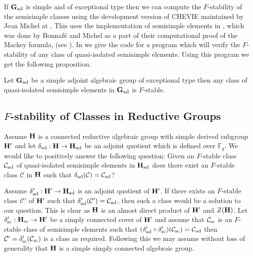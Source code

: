 \documentclass[eqthmnum]{jt-calcs}
\begin{document}
If $\mathbf{G}_{\operatorname{ad}}$ is simple and of exceptional type then we can compute the $F$-stability of the semisimple classes using the development version of CHEVIE maintained by Jean Michel at \cite{michel:2011:CHEVIE-development}. This uses the implementation of semisimple elements in \cite{geck-hiss:1996:CHEVIE}, which was done by Bonnaf\'{e} and Michel as a part of their computational proof of the Mackey formula, (see \cite{bonnafe-michel:2011:mackey-formula}). In \cite[Appendix D]{taylor:2012:thesis} we give the code for a program which will verify the $F$-stability of any class of quasi-isolated semisimple elements. Using this program we get the following proposition.

\begin{prop}
Let $\mathbf{G}_{\operatorname{ad}}$ be a simple adjoint algebraic group of exceptional type then any class of quasi-isolated semisimple elements in $\mathbf{G}_{\operatorname{ad}}$ is $F$-stable.
\end{prop}

\subsection{\texorpdfstring{$F$-stability of Classes in Reductive Groups}{Stability of Classes in Reductive Groups}}
\begin{pa}
Assume $\mathbf{H}$ is a connected reductive algebraic group with simple derived subgroup $\mathbf{H}'$ and let $\delta_{\operatorname{ad}} : \mathbf{H} \to \mathbf{H}_{\operatorname{ad}}$ be an adjoint quotient which is defined over $\mathbb{F}_q$. We would like to positively answer the following question: Given an $F$-stable class $\mathcal{C}_{\operatorname{ad}}$ of quasi-isolated semisimple elements in $\mathbf{H}_{\operatorname{ad}}$ does there exist an $F$-stable class $\mathcal{C}$ in $\mathbf{H}$ such that $\delta_{\operatorname{ad}}(\mathcal{C}) = \mathcal{C}_{\operatorname{ad}}$?

Assume $\delta_{\operatorname{ad}}' : \mathbf{H}' \to \mathbf{H}_{\operatorname{ad}}$ is an adjoint quotient of $\mathbf{H}'$. If there exists an $F$-stable class $\mathcal{C}'$ of $\mathbf{H}'$ such that $\delta_{\operatorname{ad}}'(\mathcal{C}') = \mathcal{C}_{\operatorname{ad}}$, then such a class would be a solution to our question. This is clear as $\mathbf{H}$ is an almost direct product of $\mathbf{H}'$ and $Z(\mathbf{H})$. Let $\delta_{\operatorname{sc}}' : \mathbf{H}_{\operatorname{sc}} \to \mathbf{H}'$ be a simply connected cover of $\mathbf{H}'$ and assume that $\mathcal{C}_{\operatorname{sc}}$ is an $F$-stable class of semisimple elements such that $(\delta_{\operatorname{ad}}'\circ\delta_{\operatorname{sc}}')(\mathcal{C}_{\operatorname{sc}}) = \mathcal{C}_{\operatorname{ad}}$ then $\mathcal{C}' = \delta_{\operatorname{sc}}'(\mathcal{C}_{\operatorname{sc}})$ is a class as required. Following this we may assume without loss of generality that $\mathbf{H}$ is a simple simply connected algebraic group.
\end{pa}
\end{document}
